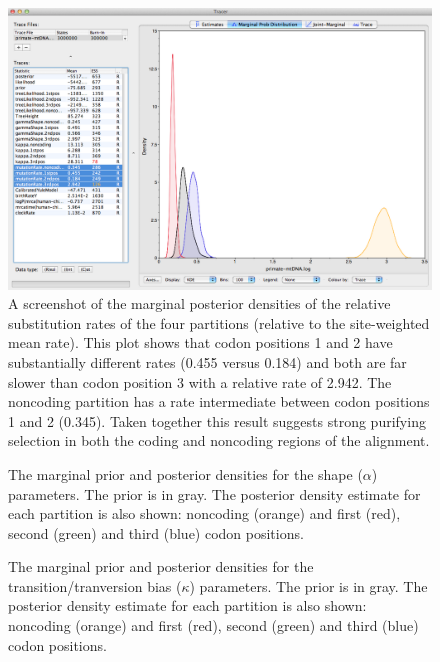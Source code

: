 \documentclass[11pt]{article}
\theoremstyle{plain}%
\theoremstyle{definition}
\theoremstyle{remark}
\begin{document}
\begin{figure}
\includegraphics[width=\textwidth]{figures/Tracer_marginalDensity}
\caption{A screenshot of the marginal posterior densities of the relative substitution rates of the four partitions (relative to the site-weighted mean rate). This plot shows that codon positions 1 and 2 have substantially different rates (0.455 versus 0.184) and both are far slower than codon position 3 with a relative rate of 2.942. The noncoding partition has a rate intermediate between codon positions 1 and 2 (0.345). Taken together this result suggests strong purifying selection in both the coding and noncoding regions of the alignment.}
\label{fig:Tracer_marginalDensity}
\end{figure}


\begin{figure}


\caption{The marginal prior and posterior densities for the shape ($\alpha$) parameters. The prior is in gray. The posterior density estimate for each partition is also shown: noncoding (orange) and first (red), second (green) and third (blue) codon positions.}
\label{fig:primatePriorPosteriorShape}
\end{figure}

\begin{figure}

\caption{The marginal prior and posterior densities for the transition/tranversion bias ($\kappa$) parameters. The prior is in gray. The posterior density estimate for each partition is also shown: noncoding (orange) and first (red), second (green) and third (blue) codon positions.}
\label{fig:primatePriorPosteriorKappa}
\end{figure}
\fi
\end{document}
